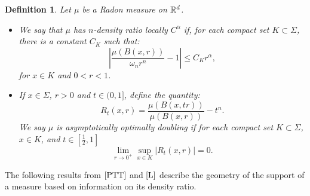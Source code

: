 \documentclass[11pt]{article}
\newtheorem{definition}[theorem]{Definition}
\theoremstyle{definition}
\theoremstyle{remark}
\numberwithin{equation}{section}
\begin{document}
\begin{definition}
Let $\mu$ be a Radon measure on $\mathbb{R}^d$.
\begin{itemize}
\item  We say that $\mu$ has $n$-density ratio locally $C^{\alpha}$  if, for each compact set $K \subset \Sigma$, there is a constant $C_{K}$ such that:
\begin{equation}\label{PTTdoublingrate}
\left|\frac{\mu(B(x,r))}{{\omega}_n r^n}-1 \right| \leq C_{K} r^{\alpha},
\end{equation}
for $x \in K$ and $0<r<1$.

\item If $x \in \Sigma$, $r>0$ and $t \in (0,1]$, define the quantity:
\begin{equation}
R_{t}(x,r)= \frac{\mu(B(x,tr))}{\mu(B(x,r))} - t^{n}.
\end{equation}
We say $\mu$ is asymptotically optimally doubling if for each compact set $K \subset \Sigma$, $x \in K$, and $t \in [\frac{1}{2},1]$ 
\begin{equation}\label{asymptoptim}
\lim_{r \to 0^{+}} \sup_{x \in K} \left| R_{t}(x,r) \right| = 0.
\end{equation}
\end{itemize}
\end{definition}
The following results from $\cite{PTT}$ and $\cite{L}$ describe the geometry of the support of a  measure based on information on its density ratio. 
\end{document}
